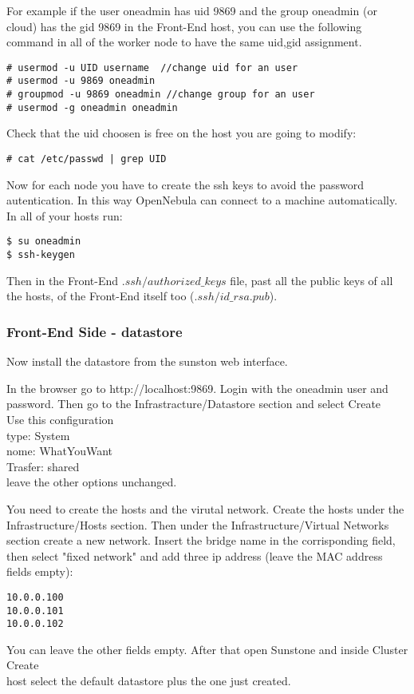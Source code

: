 \documentclass[11pt,a4paper]{article}
\begin{document}
For example if the user oneadmin has uid 9869 and the group oneadmin (or cloud) has the gid 9869 in the Front-End host, you can use the following command in all of the worker node to have the same uid,gid assignment. 
\begin{lstlisting}
# usermod -u UID username  //change uid for an user
# usermod -u 9869 oneadmin
# groupmod -u 9869 oneadmin //change group for an user
# usermod -g oneadmin oneadmin 
\end{lstlisting}

Check that the uid choosen is free on the host you are going to modify:
\begin{lstlisting}
# cat /etc/passwd | grep UID
\end{lstlisting}

Now for each node you have to create the ssh keys to avoid the password autentication. In this way OpenNebula can connect to a machine automatically.
In all of your hosts run:
\begin{lstlisting}
$ su oneadmin
$ ssh-keygen
\end{lstlisting}
Then in the Front-End $.ssh/authorized\_keys$ file, past all the public keys of all the hosts, of the Front-End itself too ($.ssh/id\_rsa.pub$). 

\subsubsection{Front-End Side - datastore}
Now install the datastore from the sunston web interface.

In the browser go to http://localhost:9869. Login with the oneadmin user and password. Then go to the Infrastracture/Datastore section and select
Create\\
Use this configuration\\
type: System\\
nome: WhatYouWant\\
Trasfer: shared\\
leave the other options unchanged.

You need to create the hosts and the virutal network.
Create the hosts under the Infrastructure/Hosts section.
Then under the Infrastructure/Virtual Networks section create a new network. Insert the bridge name in the corrisponding field, then select "fixed network" and add three ip address (leave the MAC address fields empty):
\begin{lstlisting}
10.0.0.100
10.0.0.101
10.0.0.102
\end{lstlisting}
You can leave the other fields empty.
After that open Sunstone and inside Cluster
Create\\
host
select the default datastore plus the one just created.
\end{document}

